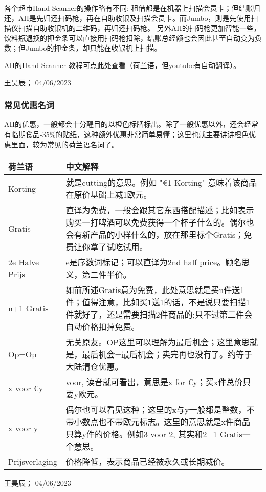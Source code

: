 各个超市Hand Scanner的操作略有不同; 租借都是在机器上扫描会员卡；但结账归还，AH是先归还扫码枪，再在自助收银及扫描会员卡。而Jumbo，则是先使用扫描仪扫描自助收银机的二维码，再归还扫码枪。 另外AH的扫码枪更加智能一些，饮料瓶退换的押金条可以直接用扫码枪扣除，结账总经额也会因此甚至自动变为负数；但Jumbo的押金条，却只能在收银机上扫描。

AH的Hand Scanner \href{https://www.youtube.com/watch?v=7MSqE_vt5Po}{\uline{教程可点此处查看（荷兰语，但youtube有自动翻译）}}。
\begin{flushright}
王昊辰； 04/06/2023
\end{flushright}



\subsubsection{常见优惠名词}
AH的优惠，一般都会十分醒目的以橙色标牌标出。除了一般优惠以外，还会经常有临期食品-35\%的贴纸，这种额外优惠非常简单易懂；这里也就主要讲讲橙色优惠里面，较为常见的荷兰语名词了。

\begin{flushleft}
\begin{tabular}{p{}|p{}}
\textbf{荷兰语} & \textbf{中文解释} \\ \hline
Korting & 就是cutting的意思。例如 "€1 Korting" 意味着该商品在原价基础上减1欧元。 \\ \hline
Gratis & 直译为免费，一般会跟其它东西搭配描述；比如表示购买一打啤酒可以免费获得一个杯子什么的。偶尔也会有新产品的小样什么的，放在那里标个Gratis；免费让你拿了试吃试用。 \\ \hline
2e Halve Prijs & e是序数词标记；可以直译为2nd half price。顾名思义，第二件半价。 \\ \hline
n+1 Gratis & 如前所述Gratis意为免费，此处意思就是买n件送1件；值得注意，比如买1送1的话，不是说只要扫描1件就好了，还是需要扫描2件商品的;只不过第二件会自动价格扣掉免费。 \\ \hline
Op=Op & 无关原友。OP这里可以理解为最后机会；这里意思就是，最后机会=最后机会；卖完再也没有了。约等于大陆清仓优惠。 \\ \hline
x voor €y & voor, 读音就可看出，意思是x for €y；买x件总价只要y欧元。 \\ \hline
x voor y & 偶尔也可以看见这种；这里的x与y一般都是整数，不带小数点也不带欧元标志。这里的意思就是x件商品只算y件的价格。例如3 voor 2, 其实和2+1 Gratis一个意思。 \\ \hline
Prijsverlaging & 价格降低，表示商品已经被永久或长期减价。 
\end{tabular}
\end{flushleft}
\begin{flushright}
王昊辰； 04/06/2023
\end{flushright}


